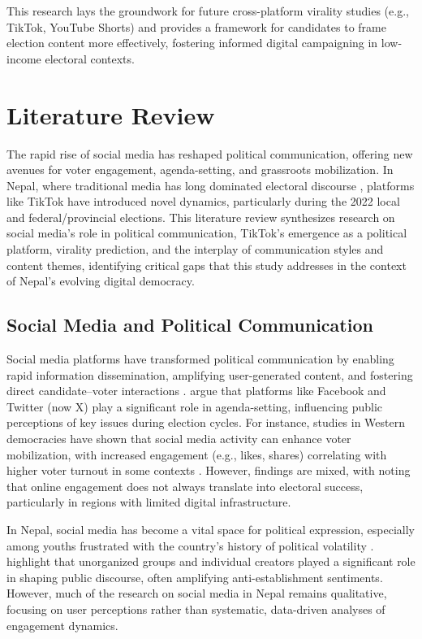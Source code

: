 \documentclass[12pt,a4paper]{report}
\begin{document}
This research lays the groundwork for future cross-platform virality studies (e.g., TikTok, YouTube Shorts) and provides a framework for candidates to frame election content more effectively, fostering informed digital campaigning in low-income electoral contexts.
\newpage
\section{Literature Review}

The rapid rise of social media has reshaped political communication, offering new avenues for voter engagement, agenda-setting, and grassroots mobilization. In Nepal, where traditional media has long dominated electoral discourse \parencite{dahal2023influence}, platforms like TikTok have introduced novel dynamics, particularly during the 2022 local and federal/provincial elections. This literature review synthesizes research on social media’s role in political communication, TikTok’s emergence as a political platform, virality prediction, and the interplay of communication styles and content themes, identifying critical gaps that this study addresses in the context of Nepal’s evolving digital democracy.

\subsection{Social Media and Political Communication}

Social media platforms have transformed political communication by enabling rapid information dissemination, amplifying user-generated content, and fostering direct candidate–voter interactions \parencite{van2013socialmedia}. \parencite{mcgregor2019socialmediaelections} argue that platforms like Facebook and Twitter (now X) play a significant role in agenda-setting, influencing public perceptions of key issues during election cycles. For instance, studies in Western democracies have shown that social media activity can enhance voter mobilization, with increased engagement (e.g., likes, shares) correlating with higher voter turnout in some contexts \parencite{bode2016campaign}. However, findings are mixed, with \parencite{piatak2021does} noting that online engagement does not always translate into electoral success, particularly in regions with limited digital infrastructure.

In Nepal, social media has become a vital space for political expression, especially among youths frustrated with the country’s history of political volatility \parencite{bhandari2024weaponizing}. \parencite{dahal2023influence} highlight that unorganized groups and individual creators played a significant role in shaping public discourse, often amplifying anti-establishment sentiments. However, much of the research on social media in Nepal remains qualitative, focusing on user perceptions rather than systematic, data-driven analyses of engagement dynamics. 
\end{document}
